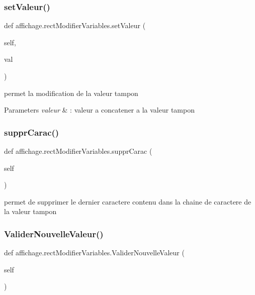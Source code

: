 \subsubsection{\texorpdfstring{set\+Valeur()}{setValeur()}}
{\footnotesize\ttfamily def affichage.\+rect\+Modifier\+Variables.\+set\+Valeur (\begin{DoxyParamCaption}\item[{}]{self,  }\item[{}]{val }\end{DoxyParamCaption})}



permet la modification de la valeur tampon 


\begin{DoxyParams}{Parameters}
{\em valeur} & \+: valeur a concatener a la valeur tampon \\
\hline
\end{DoxyParams}
\mbox{\label{classaffichage_1_1rect_modifier_variables_add25dd453e03aee3377fa7d294704d24}} 
\subsubsection{\texorpdfstring{suppr\+Carac()}{supprCarac()}}
{\footnotesize\ttfamily def affichage.\+rect\+Modifier\+Variables.\+suppr\+Carac (\begin{DoxyParamCaption}\item[{}]{self }\end{DoxyParamCaption})}



permet de supprimer le dernier caractere contenu dans la chaine de caractere de la valeur tampon 

\mbox{\label{classaffichage_1_1rect_modifier_variables_a3593e171bfa0f5f4cc668ac9d75698f0}} 
\subsubsection{\texorpdfstring{Valider\+Nouvelle\+Valeur()}{ValiderNouvelleValeur()}}
{\footnotesize\ttfamily def affichage.\+rect\+Modifier\+Variables.\+Valider\+Nouvelle\+Valeur (\begin{DoxyParamCaption}\item[{}]{self }\end{DoxyParamCaption})}



